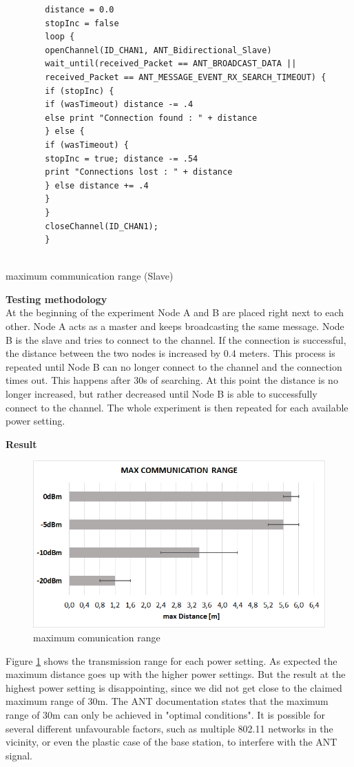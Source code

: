\begin{description}
	\begin{code}[H]
		\begin{verbatim}
		distance = 0.0
		stopInc = false
		loop {
		openChannel(ID_CHAN1, ANT_Bidirectional_Slave)
		wait_until(received_Packet == ANT_BROADCAST_DATA || 
		received_Packet == ANT_MESSAGE_EVENT_RX_SEARCH_TIMEOUT) {
		if (stopInc) { 
		if (wasTimeout) distance -= .4
		else print "Connection found : " + distance
		} else {
		if (wasTimeout) { 
		stopInc = true; distance -= .54
		print "Connections lost : " + distance
		} else distance += .4
		}
		}
		closeChannel(ID_CHAN1);		
		}
		
		\end{verbatim}
		\caption{maximum communication range (Slave)}\label{lst:sExp6}
	\end{code}
	\item{\textbf{Testing methodology}} \hfill \\ At the beginning of the experiment Node A and B are placed right next to each other. Node A acts as a master and keeps broadcasting the same message. Node B is the slave and tries to connect to the channel. If the connection is successful, the distance between the two nodes is increased by 0.4 meters. This process is repeated until Node B can no longer connect to the channel and the connection times out. This happens after 30s of searching. At this point the distance is no longer increased, but rather decreased until Node B is able to successfully connect to the channel. The whole experiment is then repeated for each available power setting.	
	\item{\textbf{Result}} \hfill \\ 
	\begin{figure}[H]
		\centering
		\includegraphics[scale=0.5]{content/images/exp6.png}
		\caption{maximum comunication range}\label{fig:exp6}
	\end{figure}
	Figure \ref{fig:exp6} shows the transmission range for each power setting. As expected the maximum distance goes up with the higher power settings. But the result at the highest power setting is disappointing, since we did not get close to the claimed maximum range of 30m. The ANT documentation states that the maximum range of 30m can only be achieved in "optimal conditions"\cite{DynastreamInnovationsInc.2013}. It is possible for several different unfavourable factors, such as multiple 802.11 networks in the vicinity, or even the plastic case of the base station, to interfere with the ANT signal. 
\end{description}
\newpage